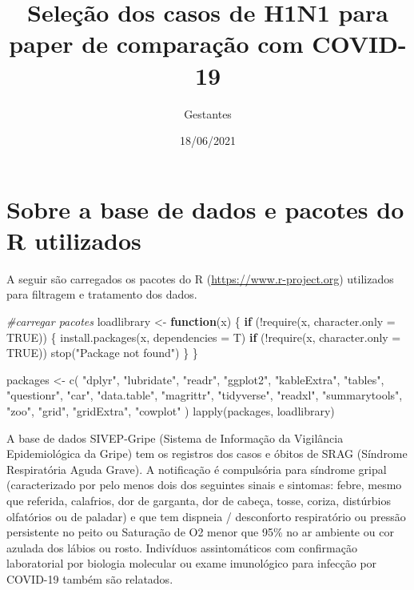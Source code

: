 \documentclass[
]{article}
\title{Seleção dos casos de H1N1 para paper de comparação com COVID-19}
\author{Gestantes}
\date{18/06/2021}
\newenvironment{Shaded}{\begin{snugshade}}{\end{snugshade}}
\newcommand{\AttributeTok}[1]{\textcolor[rgb]{0.77,0.63,0.00}{#1}}
\newcommand{\CommentTok}[1]{\textcolor[rgb]{0.56,0.35,0.01}{\textit{#1}}}
\newcommand{\ConstantTok}[1]{\textcolor[rgb]{0.00,0.00,0.00}{#1}}
\newcommand{\ControlFlowTok}[1]{\textcolor[rgb]{0.13,0.29,0.53}{\textbf{#1}}}
\newcommand{\FunctionTok}[1]{\textcolor[rgb]{0.00,0.00,0.00}{#1}}
\newcommand{\NormalTok}[1]{#1}
\newcommand{\OtherTok}[1]{\textcolor[rgb]{0.56,0.35,0.01}{#1}}
\newcommand{\SpecialCharTok}[1]{\textcolor[rgb]{0.00,0.00,0.00}{#1}}
\newcommand{\StringTok}[1]{\textcolor[rgb]{0.31,0.60,0.02}{#1}}
\begin{document}
\maketitle

\hypertarget{sobre-a-base-de-dados-e-pacotes-do-r-utilizados}{%
\section{Sobre a base de dados e pacotes do R
utilizados}\label{sobre-a-base-de-dados-e-pacotes-do-r-utilizados}}

A seguir são carregados os pacotes do R
(\url{https://www.r-project.org}) utilizados para filtragem e tratamento
dos dados.

\begin{Shaded}
\begin{Highlighting}[]
\CommentTok{\#carregar pacotes}
\NormalTok{loadlibrary }\OtherTok{\textless{}{-}} \ControlFlowTok{function}\NormalTok{(x) \{}
  \ControlFlowTok{if}\NormalTok{ (}\SpecialCharTok{!}\FunctionTok{require}\NormalTok{(x, }\AttributeTok{character.only =} \ConstantTok{TRUE}\NormalTok{)) \{}
    \FunctionTok{install.packages}\NormalTok{(x, }\AttributeTok{dependencies =}\NormalTok{ T)}
    \ControlFlowTok{if}\NormalTok{ (}\SpecialCharTok{!}\FunctionTok{require}\NormalTok{(x, }\AttributeTok{character.only =} \ConstantTok{TRUE}\NormalTok{))}
      \FunctionTok{stop}\NormalTok{(}\StringTok{"Package not found"}\NormalTok{)}
\NormalTok{  \}}
\NormalTok{\}}

\NormalTok{packages }\OtherTok{\textless{}{-}}
  \FunctionTok{c}\NormalTok{(}
    \StringTok{"dplyr"}\NormalTok{,}
    \StringTok{"lubridate"}\NormalTok{,}
    \StringTok{"readr"}\NormalTok{,}
    \StringTok{"ggplot2"}\NormalTok{,}
    \StringTok{"kableExtra"}\NormalTok{,}
    \StringTok{"tables"}\NormalTok{,}
    \StringTok{"questionr"}\NormalTok{,}
    \StringTok{"car"}\NormalTok{,}
    \StringTok{"data.table"}\NormalTok{,}
    \StringTok{"magrittr"}\NormalTok{,}
    \StringTok{"tidyverse"}\NormalTok{,}
    \StringTok{"readxl"}\NormalTok{,}
    \StringTok{"summarytools"}\NormalTok{,}
    \StringTok{"zoo"}\NormalTok{,}
    \StringTok{"grid"}\NormalTok{,}
    \StringTok{"gridExtra"}\NormalTok{,}
    \StringTok{"cowplot"}
\NormalTok{  )}
\FunctionTok{lapply}\NormalTok{(packages, loadlibrary)}
\end{Highlighting}
\end{Shaded}

A base de dados SIVEP-Gripe (Sistema de Informação da Vigilância
Epidemiológica da Gripe) tem os registros dos casos e óbitos de SRAG
(Síndrome Respiratória Aguda Grave). A notificação é compulsória para
síndrome gripal (caracterizado por pelo menos dois dos seguintes sinais
e sintomas: febre, mesmo que referida, calafrios, dor de garganta, dor
de cabeça, tosse, coriza, distúrbios olfatórios ou de paladar) e que tem
dispneia / desconforto respiratório ou pressão persistente no peito ou
Saturação de O2 menor que 95\% no ar ambiente ou cor azulada dos lábios
ou rosto. Indivíduos assintomáticos com confirmação laboratorial por
biologia molecular ou exame imunológico para infecção por COVID-19
também são relatados.
\end{document}
